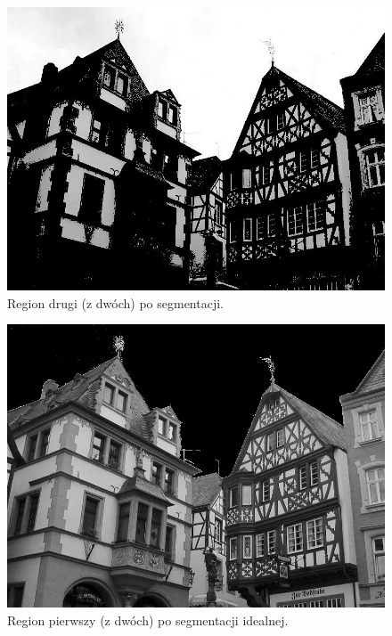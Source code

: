 \documentclass[10pt]{llncs}
\begin{document}
\begin{figure}[!htb]
  \includegraphics[width=\linewidth]{img/04_region_02.jpg}
  \caption{Region drugi (z dwóch) po segmentacji.}\label{fig:311}
\endminipage
\end{figure}

\begin{figure}[!htb]
  \includegraphics[width=\linewidth]{img/04_correct_segmentation.jpg}
  \caption{Region pierwszy (z dwóch) po segmentacji idealnej.}\label{fig:3_prim}
\endminipage\hfill
\end{figure}

\FloatBarrier
\end{document}

